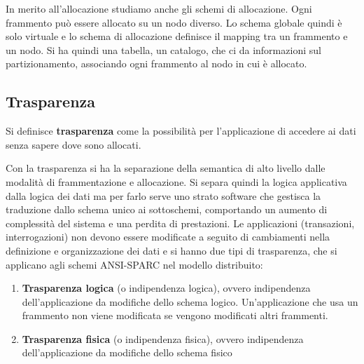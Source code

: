 In merito all'allocazione studiamo anche gli schemi di allocazione. Ogni
frammento può essere allocato su un nodo diverso. Lo schema globale quindi
è solo virtuale e lo schema di allocazione definisce il mapping tra un frammento
e un nodo. Si ha quindi una tabella, un catalogo, che ci da informazioni sul
partizionamento, associando ogni frammento al nodo in cui è allocato.
\subsection{Trasparenza}
\begin{definizione}
      Si definisce \textbf{trasparenza} come la possibilità per l'applicazione di
      accedere ai dati senza sapere dove sono allocati.
\end{definizione}
Con la trasparenza si ha la separazione della semantica di alto livello dalle
modalità di frammentazione e allocazione. Si separa quindi la logica applicativa
dalla logica dei dati ma per farlo serve uno strato software che gestisca la
traduzione dallo schema unico ai sottoschemi, comportando un aumento di
complessità del sistema e una perdita di prestazioni.
Le applicazioni (transazioni, interrogazioni) non devono essere modificate a
seguito di cambiamenti nella definizione e organizzazione dei dati e si hanno
due tipi di trasparenza, che si applicano agli schemi ANSI-SPARC nel
modello distribuito:
\begin{enumerate}
      \item \textbf{Trasparenza logica} (o indipendenza logica), ovvero
            indipendenza dell'applicazione da modifiche dello schema logico.
            Un'applicazione che usa un frammento non viene modificata se vengono
            modificati altri frammenti.
      \item \textbf{Trasparenza fisica} (o indipendenza fisica), ovvero
            indipendenza dell'applicazione da modifiche dello schema fisico
\end{enumerate}

